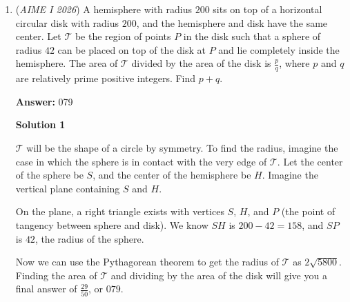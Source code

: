 \begin{enumerate}
 Case 6: $11$ digit number

 We have $abcdefedcba$ as the $11$ digit palindrome. We perform all the above steps and eventually get $a_1 + b_1 + \cdots + e_1$ ranges from $-3$ to $1$. So we only take $0$ and $1$. By Stars and Bars, we get

 $\binom{0 + 5 - 1}{5 - 1} + \binom{1 + 5 - 1}{5 - 1} = \binom{4}{4} + \binom{5}{4} = \binom{6}{5} = 6$ numbers where the last step again follows from Hockey-Stick Identity.

 Case 7: $13$ digit number

 We have $abcdefgfedcba$ as the $13$ digit number. Again, by going through all the steps, we get $a_1 + \cdots + f_1$ ranges from $-4$ to $0$. Thus, we only consider $0$. By Stars and Bars, we get

 $\binom{0 + 6 - 1}{6 - 1} = \binom{5}{5} = 1$ number.

 As we established earlier that for this problem, $13$ digits was the limit, we have covered all the cases. Finally, we add up to get

 $5 + 15 + 20 + 15 + 6 + 1 = \boxed{062}$



	\item (\textit{AIME I 2026}) A hemisphere with radius $200$ sits on top of a horizontal circular disk with radius $200$, and the hemisphere and disk have the same center. Let $\mathcal{T}$ be the region of points $P$ in the disk such that a sphere of radius $42$ can be placed on top of the disk at $P$ and lie completely inside the hemisphere. The area of $\mathcal{T}$ divided by the area of the disk is $\frac{p}{q}$, where $p$ and $q$ are relatively prime positive integers. Find $p+q$.


 
 \textbf{Answer: }079



\textbf{Solution 1}

$\mathcal T$ will be the shape of a circle by symmetry. To find the radius, imagine the case in which the sphere is in contact with the very edge of $\mathcal T$. Let the center of the sphere be $S$, and the center of the hemisphere be $H$. Imagine the vertical plane containing $S$ and $H$.

 
On the plane, a right triangle exists with vertices $S$, $H$, and $P$ (the point of tangency between sphere and disk). We know $SH$ is $200 - 42 = 158$, and $SP$ is $42$, the radius of the sphere. 

 
Now we can use the Pythagorean theorem to get the radius of $\mathcal T$ as $2\sqrt{5800}$. Finding the area of $\mathcal T$ and dividing by the area of the disk will give you a final answer of $\frac{29}{50}$, or $\boxed{079}$.


\end{enumerate}
